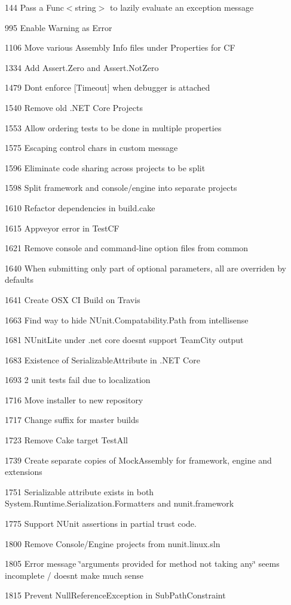 \begin{DoxyItemize}
\item 144 Pass a {\ttfamily Func$<$string$>$} to lazily evaluate an exception message
\item 995 Enable Warning as Error
\item 1106 Move various Assembly Info files under Properties for CF
\item 1334 Add Assert.\+Zero and Assert.\+Not\+Zero
\item 1479 Don\textquotesingle{}t enforce \mbox{[}Timeout\mbox{]} when debugger is attached
\item 1540 Remove old .N\+ET Core Projects
\item 1553 Allow ordering tests to be done in multiple properties
\item 1575 Escaping control chars in custom message
\item 1596 Eliminate code sharing across projects to be split
\item 1598 Split framework and console/engine into separate projects
\item 1610 Refactor dependencies in build.\+cake
\item 1615 Appveyor error in Test\+CF
\item 1621 Remove console and command-\/line option files from common
\item 1640 When submitting only part of optional parameters, all are overriden by defaults
\item 1641 Create O\+SX CI Build on Travis
\item 1663 Find way to hide N\+Unit.\+Compatability.\+Path from intellisense
\item 1681 N\+Unit\+Lite under .net core doesn\textquotesingle{}t support Team\+City output
\item 1683 Existence of Serializable\+Attribute in .N\+ET Core
\item 1693 2 unit tests fail due to localization
\item 1716 Move installer to new repository
\item 1717 Change suffix for master builds
\item 1723 Remove Cake target Test\+All
\item 1739 Create separate copies of Mock\+Assembly for framework, engine and extensions
\item 1751 Serializable attribute exists in both System.\+Runtime.\+Serialization.\+Formatters and nunit.\+framework
\item 1775 Support N\+Unit assertions in partial trust code.
\item 1800 Remove Console/\+Engine projects from nunit.\+linux.\+sln
\item 1805 Error message \char`\"{}arguments provided for method not taking any\char`\"{} seems incomplete / doesn\textquotesingle{}t make much sense
\item 1815 Prevent Null\+Reference\+Exception in Sub\+Path\+Constraint
\end{DoxyItemize}

